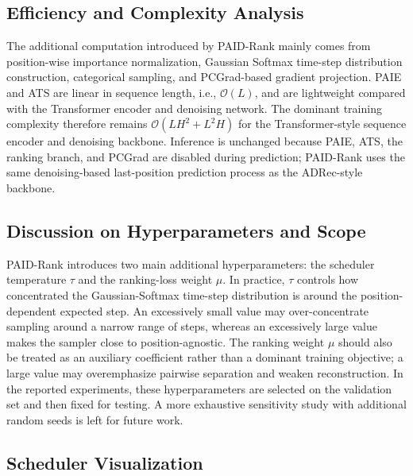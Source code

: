 \documentclass[runningheads,a4paper]{llncs}
\begin{document}
\subsection{Efficiency and Complexity Analysis}
\label{subsec:complexity}

The additional computation introduced by PAID-Rank mainly comes from position-wise importance normalization, Gaussian Softmax time-step distribution construction, categorical sampling, and PCGrad-based gradient projection. PAIE and ATS are linear in sequence length, i.e., $\mathcal{O}(L)$, and are lightweight compared with the Transformer encoder and denoising network. The dominant training complexity therefore remains $\mathcal{O}(LH^2+L^2H)$ for the Transformer-style sequence encoder and denoising backbone. Inference is unchanged because PAIE, ATS, the ranking branch, and PCGrad are disabled during prediction; PAID-Rank uses the same denoising-based last-position prediction process as the ADRec-style backbone.


\subsection{Discussion on Hyperparameters and Scope}
\label{subsec:sensitivity}

PAID-Rank introduces two main additional hyperparameters: the scheduler temperature $\tau$ and the ranking-loss weight $\mu$. In practice, $\tau$ controls how concentrated the Gaussian-Softmax time-step distribution is around the position-dependent expected step. An excessively small value may over-concentrate sampling around a narrow range of steps, whereas an excessively large value makes the sampler close to position-agnostic. The ranking weight $\mu$ should also be treated as an auxiliary coefficient rather than a dominant training objective; a large value may overemphasize pairwise separation and weaken reconstruction. In the reported experiments, these hyperparameters are selected on the validation set and then fixed for testing. A more exhaustive sensitivity study with additional random seeds is left for future work.

\subsection{Scheduler Visualization}
\label{subsec:diagnosis_plots}
\end{document}
